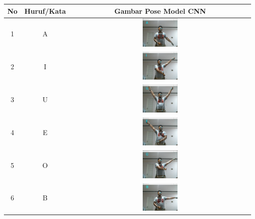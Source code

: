 \begin{table}[h]
	\centering
	\label{tbl:Tabel Contoh Huruf/Kata dan Gambar Pose Model CNN Orang Pertama}
	\begin{tabular}{|c|c|c|}
	\hline
	No & Huruf/Kata & Gambar Pose Model CNN \\
	\hline
	1 & A & \includegraphics[width=0.2\textwidth]{gambar/bener/HurufA_ModelCNN_Dawe.png} \\
	\hline
	2 & I & \includegraphics[width=0.2\textwidth]{gambar/bener/HurufI_ModelCNN_Dawe.png} \\
	\hline
	3 & U & \includegraphics[width=0.2\textwidth]{gambar/bener/HurufU_ModelCNN_Dawe.png} \\
	\hline
	4 & E & \includegraphics[width=0.2\textwidth]{gambar/bener/HurufE_ModelCNN_Dawe.png} \\
	\hline
	5 & O & \includegraphics[width=0.2\textwidth]{gambar/bener/HurufO_ModelCNN_Dawe.png} \\
	\hline
	6 & B & \includegraphics[width=0.2\textwidth]{gambar/bener/HurufB_ModelCNN_Dawe.png} \\

\end{tabular}
\end{table}
